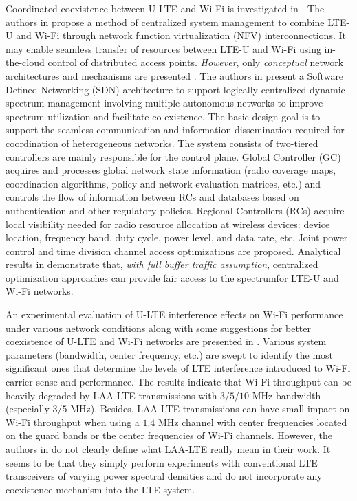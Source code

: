 \documentclass[journal,draftclsnofoot,12pt,onecolumn]{IEEEtran}
\begin{document}
Coordinated coexistence between U-LTE and Wi-Fi is investigated in \cite{U-LTE-5G-2015, Coordinated-LTE-U-Wi-Fi-2015}. The authors in \cite{U-LTE-5G-2015} propose a method of centralized system management to combine LTE-U and Wi-Fi through network function virtualization (NFV) interconnections. It may enable seamless transfer of resources between LTE-U and Wi-Fi using in-the-cloud control of distributed access points. \textit{However}, only \textit{conceptual} network architectures and mechanisms are presented \cite{U-LTE-5G-2015}. The authors in \cite{Coordinated-LTE-U-Wi-Fi-2015} present a Software Defined Networking (SDN) architecture to support logically-centralized dynamic spectrum management involving multiple autonomous networks to improve spectrum utilization and facilitate co-existence. The basic design goal is to support the seamless communication and information dissemination required for coordination of heterogeneous networks. The system consists of two-tiered controllers are mainly responsible for the control plane. Global Controller (GC) acquires and processes global network state information (radio coverage maps, coordination algorithms, policy and network evaluation matrices, etc.) and controls the flow of information between RCs and databases based on authentication and other regulatory policies. Regional Controllers (RCs) acquire local visibility needed for radio resource allocation at wireless devices: device location, frequency band, duty cycle, power level, and data rate, etc. Joint power control and time division channel access optimizations are proposed. Analytical results in \cite{Coordinated-LTE-U-Wi-Fi-2015} demonstrate that, \textit{with full buffer traffic assumption}, centralized optimization approaches can provide fair access to the spectrumfor LTE-U and Wi-Fi networks.

An experimental evaluation of U-LTE interference effects on Wi-Fi performance under various network conditions along with some suggestions for better coexistence of U-LTE and Wi-Fi networks are presented in \cite{LTE-U-Experiment-ICC-WS-2015}. Various system parameters (bandwidth, center frequency, etc.) are swept to identify the most significant ones that determine the levels of LTE interference introduced to Wi-Fi carrier sense and performance. The results indicate that Wi-Fi throughput can be heavily degraded by LAA-LTE transmissions with $3$/$5$/$10$ MHz bandwidth (especially $3$/$5$ MHz). Besides, LAA-LTE transmissions can have small impact on Wi-Fi throughput when using a $1.4$ MHz channel with center frequencies located on the guard bands or the center frequencies of Wi-Fi channels. However, the authors in \cite{LTE-U-Experiment-ICC-WS-2015} do not clearly define what LAA-LTE really mean in their work. It seems to be that they simply perform experiments with conventional LTE transceivers of varying power spectral densities and do not incorporate any coexistence mechanism into the LTE system.
\end{document}

